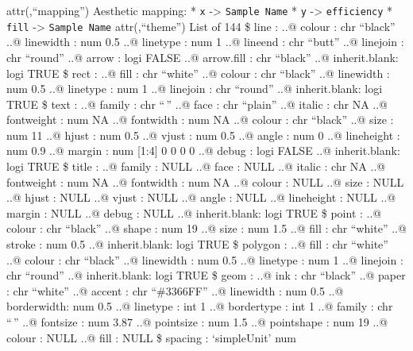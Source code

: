 \documentclass[
]{article}
\begin{document}
attr(,``mapping'') Aesthetic mapping: * \texttt{x} -\textgreater{}
\texttt{Sample\ Name} * \texttt{y} -\textgreater{} \texttt{efficiency} *
\texttt{fill} -\textgreater{} \texttt{Sample\ Name} attr(,``theme'')
List of 144 \$ line : ..@ colour : chr ``black'' ..@ linewidth : num 0.5
..@ linetype : num 1 ..@ lineend : chr ``butt'' ..@ linejoin : chr
``round'' ..@ arrow : logi FALSE ..@ arrow.fill : chr ``black'' ..@
inherit.blank: logi TRUE \$ rect : ..@ fill : chr ``white'' ..@ colour :
chr ``black'' ..@ linewidth : num 0.5 ..@ linetype : num 1 ..@ linejoin
: chr ``round'' ..@ inherit.blank: logi TRUE \$ text : ..@ family : chr
``\,'' ..@ face : chr ``plain'' ..@ italic : chr NA ..@ fontweight : num
NA ..@ fontwidth : num NA ..@ colour : chr ``black'' ..@ size : num 11
..@ hjust : num 0.5 ..@ vjust : num 0.5 ..@ angle : num 0 ..@ lineheight
: num 0.9 ..@ margin : num {[}1:4{]} 0 0 0 0 ..@ debug : logi FALSE ..@
inherit.blank: logi TRUE \$ title : ..@ family : NULL ..@ face : NULL
..@ italic : chr NA ..@ fontweight : num NA ..@ fontwidth : num NA ..@
colour : NULL ..@ size : NULL ..@ hjust : NULL ..@ vjust : NULL ..@
angle : NULL ..@ lineheight : NULL ..@ margin : NULL ..@ debug : NULL
..@ inherit.blank: logi TRUE \$ point : ..@ colour : chr ``black'' ..@
shape : num 19 ..@ size : num 1.5 ..@ fill : chr ``white'' ..@ stroke :
num 0.5 ..@ inherit.blank: logi TRUE \$ polygon : ..@ fill : chr
``white'' ..@ colour : chr ``black'' ..@ linewidth : num 0.5 ..@
linetype : num 1 ..@ linejoin : chr ``round'' ..@ inherit.blank: logi
TRUE \$ geom : ..@ ink : chr ``black'' ..@ paper : chr ``white'' ..@
accent : chr ``\#3366FF'' ..@ linewidth : num 0.5 ..@ borderwidth: num
0.5 ..@ linetype : int 1 ..@ bordertype : int 1 ..@ family : chr ``\,''
..@ fontsize : num 3.87 ..@ pointsize : num 1.5 ..@ pointshape : num 19
..@ colour : NULL ..@ fill : NULL \$ spacing : `simpleUnit' num
\end{document}
